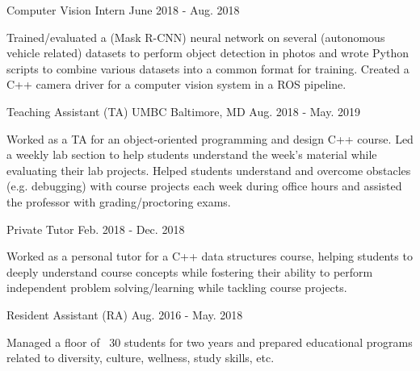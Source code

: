 \begin{cventries}
  \cventry
    {Computer Vision Intern} %
    {} %
    {} %
    {June 2018 - Aug. 2018} %
    {
      \begin{cvitems} %
        \item {Trained/evaluated a (Mask R-CNN) neural network on several (autonomous vehicle related) datasets to perform object detection in photos and wrote Python scripts to combine various datasets into a common format for training.  Created a C++ camera driver for a computer vision system in a ROS pipeline.}
      \end{cvitems}
    }

  \cventry
    {Teaching Assistant (TA)} %
    {UMBC} %
    {Baltimore, MD} %
    {Aug. 2018 - May. 2019} %
    {
      \begin{cvitems} %
        \item{Worked as a TA for an object-oriented programming and design C++ course.  Led a weekly lab section to help students understand the week's material while evaluating their lab projects.  Helped students understand and overcome obstacles (e.g. debugging) with course projects each week during office hours and assisted the professor with grading/proctoring exams.}
      \end{cvitems}
    }

  \cventry
    {Private Tutor} %
    {} %
    {} %
    {Feb. 2018 - Dec. 2018} %
    {
      \begin{cvitems} %
        \item{Worked as a personal tutor for a C++ data structures course, helping students to deeply understand course concepts while fostering their ability to perform independent problem solving/learning while tackling course projects.}
      \end{cvitems}
    }

  \cventry
    {Resident Assistant (RA)} %
    {} %
    {} %
    {Aug. 2016 - May. 2018} %
    {
      \begin{cvitems} %
        \item{Managed a floor of ~30 students for two years and prepared educational programs related to diversity, culture, wellness, study skills, etc.}
      \end{cvitems}
    }


\end{cventries}
